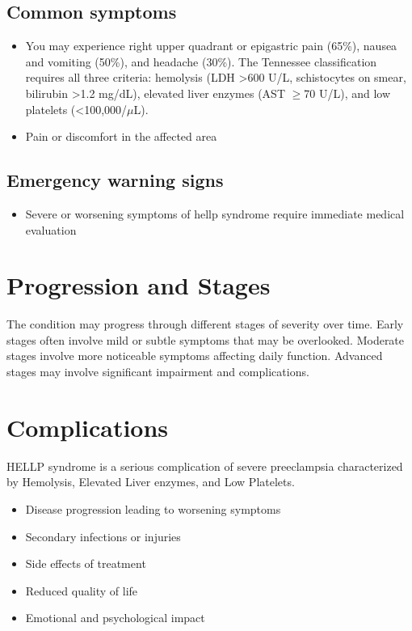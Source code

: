 \subsection{Common symptoms}
\begin{itemize}[noitemsep]
  \item You may experience right upper quadrant or epigastric pain (65\%), nausea and vomiting (50\%), and headache (30\%). The Tennessee classification requires all three criteria: hemolysis (LDH >600 U/L, schistocytes on smear, bilirubin >1.2 mg/dL), elevated liver enzymes (AST $\ge$70 U/L), and low platelets (<100,000/$\mu$L).

  \item Pain or discomfort in the affected area
  \end{itemize}

\subsection{Emergency warning signs}
\begin{itemize}[noitemsep]
  \item Severe or worsening symptoms of hellp syndrome require immediate medical evaluation
\end{itemize}
\section{Progression and Stages}
The condition may progress through different stages of severity over time. Early stages often involve mild or subtle symptoms that may be overlooked. Moderate stages involve more noticeable symptoms affecting daily function. Advanced stages may involve significant impairment and complications.
\section{Complications}
HELLP syndrome is a serious complication of severe preeclampsia characterized by Hemolysis, Elevated Liver enzymes, and Low Platelets.

\begin{itemize}[noitemsep]
  \item Disease progression leading to worsening symptoms
  \item Secondary infections or injuries
  \item Side effects of treatment
  \item Reduced quality of life
  \item Emotional and psychological impact
\end{itemize}
